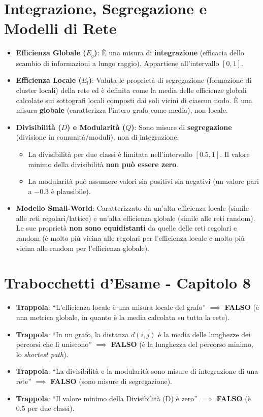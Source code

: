 \documentclass[10pt, letterpaper]{report}
\begin{document}
\section{Integrazione, Segregazione e Modelli di Rete}
\begin{itemize}
    \item \textbf{Efficienza Globale (\(E_g\))}: È una misura di \textbf{integrazione} (efficacia dello scambio di informazioni a lungo raggio). Appartiene all'intervallo \([0, 1]\).
    \item \textbf{Efficienza Locale (\(E_l\))}: Valuta le proprietà di segregazione (formazione di cluster locali) della rete ed è definita come la media delle efficienze globali calcolate sui sottografi locali composti dai soli vicini di ciascun nodo. È una misura \textbf{globale} (caratterizza l'intero grafo come media), non locale.
    \item \textbf{Divisibilità (\(D\)) e Modularità (\(Q\))}: Sono misure di \textbf{segregazione} (divisione in comunità/moduli), non di integrazione.
    \begin{itemize}
        \item La divisibilità per due classi è limitata nell'intervallo \([0.5, 1]\). Il valore minimo della divisibilità \textbf{non può essere zero}.
        \item La modularità può assumere valori sia positivi sia negativi (un valore pari a \(-0.3\) è plausibile).
    \end{itemize}
    \item \textbf{Modello Small-World}: Caratterizzato da un'alta efficienza locale (simile alle reti regolari/lattice) e un'alta efficienza globale (simile alle reti random). Le sue proprietà \textbf{non sono equidistanti} da quelle delle reti regolari e random (è molto più vicina alle regolari per l'efficienza locale e molto più vicina alle random per l'efficienza globale).
\end{itemize}

\section*{Trabocchetti d'Esame - Capitolo 8}
\begin{itemize}
    \item \textbf{Trappola}: ``L'efficienza locale è una misura locale del grafo'' \(\implies\) \textbf{FALSO} (è una metrica globale, in quanto è la media calcolata su tutta la rete).
    \item \textbf{Trappola}: ``In un grafo, la distanza \(d(i,j)\) è la media delle lunghezze dei percorsi che li uniscono'' \(\implies\) \textbf{FALSO} (è la lunghezza del percorso minimo, lo \emph{shortest path}).
    \item \textbf{Trappola}: ``La divisibilità e la modularità sono misure di integrazione di una rete'' \(\implies\) \textbf{FALSO} (sono misure di segregazione).
    \item \textbf{Trappola}: ``Il valore minimo della Divisibilità (D) è zero'' \(\implies\) \textbf{FALSO} (è 0.5 per due classi).
\end{itemize}
\end{document}
